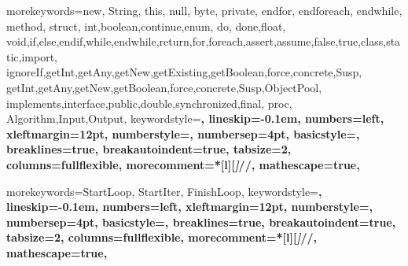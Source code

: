  {
  morekeywords={new, String, this, null, byte, private,
                endfor, endforeach, endwhile, method, struct,
                int,boolean,continue,enum, do, done,float,
                void,if,else,endif,while,endwhile,return,for,foreach,assert,assume,false,true,class,static,import,
                ignoreIf,getInt,getAny,getNew,getExisting,getBoolean,force,concrete,Susp,
                getInt,getAny,getNew,getBoolean,force,concrete,Susp,ObjectPool,
                implements,interface,public,double,synchronized,final,
                proc,
                Algorithm,Input,Output},
  keywordstyle=\bfseries,
  lineskip=-0.1em,
  numbers=left,
  xleftmargin=12pt,
  numberstyle=\tiny,
  numbersep=4pt,
  basicstyle=\scriptsize\sffamily,
  breaklines=true,
  breakautoindent=true,
  tabsize=2,
  columns=fullflexible,
  morecomment=*[l][\textsl]{//},
  mathescape=true,
}


\lstset{language=pseudo}

 {
  morekeywords={StartLoop, StartIter, FinishLoop},
  keywordstyle=\bfseries,
  lineskip=-0.1em,
  numbers=left,
  xleftmargin=12pt,
  numberstyle=\tiny,
  numbersep=4pt,
  basicstyle=\scriptsize\sffamily,
  breaklines=true,
  breakautoindent=true,
  tabsize=2,
  columns=fullflexible,
  morecomment=*[l][\textsl]{//},
  mathescape=true,
}



